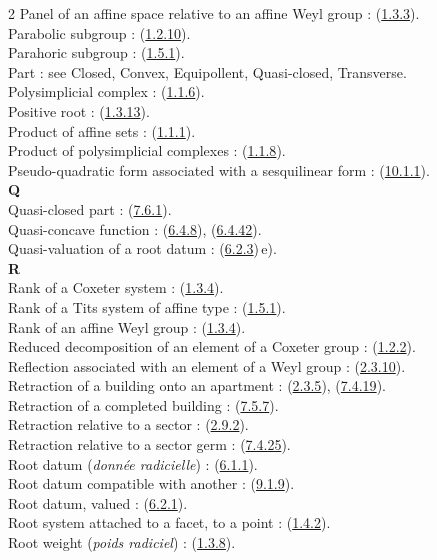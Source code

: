 \documentclass[12pt,a4paper,oneside,english]{smfart}
\newcommand{\btref}[1]{\hyperlink{bt:#1}{#1}}
\theoremstyle{definition}
\theoremstyle{bt}
\begin{document}
\begin{multicols}{2}
Panel of an affine space relative to an affine Weyl group : (\btref{1.3.3}).\\
Parabolic subgroup : (\btref{1.2.10}).\\
Parahoric subgroup : (\btref{1.5.1}).\\
Part : see Closed, Convex, Equipollent, Quasi-closed, Transverse.\\
Polysimplicial complex : (\btref{1.1.6}).\\
Positive root : (\btref{1.3.13}).\\
Product of affine sets : (\btref{1.1.1}).\\
Product of polysimplicial complexes : (\btref{1.1.8}).\\
Pseudo-quadratic form associated with a sesquilinear form : (\btref{10.1.1}).\\
\textbf{Q}\\
Quasi-closed part : (\btref{7.6.1}).\\
Quasi-concave function : (\btref{6.4.8}), (\btref{6.4.42}).\\
Quasi-valuation of a root datum : (\btref{6.2.3})\,e).\\
\textbf{R}\\
Rank of a Coxeter system : (\btref{1.3.4}).\\
Rank of a Tits system of affine type : (\btref{1.5.1}).\\
Rank of an affine Weyl group : (\btref{1.3.4}).\\
Reduced decomposition of an element of a Coxeter group : (\btref{1.2.2}).\\
Reflection associated with an element of a Weyl group : (\btref{2.3.10}).\\
Retraction of a building onto an apartment : (\btref{2.3.5}), (\btref{7.4.19}).\\
Retraction of a completed building : (\btref{7.5.7}).\\
Retraction relative to a sector : (\btref{2.9.2}).\\
Retraction relative to a sector germ : (\btref{7.4.25}).\\
Root datum (\emph{donnée radicielle}) : (\btref{6.1.1}).\\
Root datum compatible with another : (\btref{9.1.9}).\\
Root datum, valued : (\btref{6.2.1}).\\
Root system attached to a facet, to a point : (\btref{1.4.2}).\\
Root weight (\emph{poids radiciel}) : (\btref{1.3.8}).\\

\end{multicols}
\end{document}
